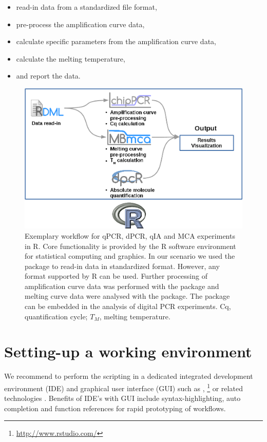 \begin{itemize}
 \item read-in data from a standardized file format,
 \item pre-process the amplification curve data,
 \item calculate specific parameters from the amplification curve data,
 \item calculate the melting temperature,
 \item and report the data.
\end{itemize}

\begin{figure}[htbp]
  \centering
  \includegraphics{figures/workflow.png}
  \caption{Exemplary workflow for qPCR, dPCR, qIA and MCA experiments in R. Core 
functionality is provided by the R software environment for statistical 
computing and graphics. In our scenario we used the  package to 
read-in data in standardized format. However, any format supported by R can be 
used. Further processing of amplification curve data was performed with the 
 package and melting curve data were analysed with the 
 package. The  package can be embedded in the 
analysis of digital PCR experiments. Cq, quantification cycle; $T_{M}$, melting 
temperature. 
} \label{figure:workflow}
\end{figure}

\section{Setting-up a working environment}

We recommend to perform the scripting in a dedicated integrated development 
environment (IDE) and graphical user interface (GUI) such as  
\citep{rodiger_rkward_2012}, 
\footnote{\url{http://www.rstudio.com/}} or related technologies 
\citep{Valero_2012}. Benefits of IDE's with GUI include syntax-highlighting, 
auto completion and function references for rapid prototyping of workflows.

